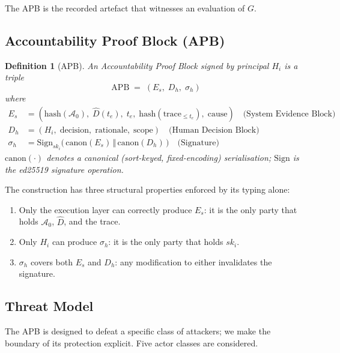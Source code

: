 \documentclass[11pt]{article}
\newtheorem{definition}{Definition}[section]
\newcommand{\Azero}{\mathcal{A}_0}
\newcommand{\Dhat}{\widehat{D}}
\newcommand{\Es}{E_s}
\newcommand{\Dh}{D_h}
\newcommand{\sigh}{\sigma_h}
\newcommand{\Hi}{H_i}
\newcommand{\ski}{sk_i}
\newcommand{\APB}{\mathrm{APB}}
\begin{document}
The APB is the recorded artefact that witnesses an evaluation of
$G$.

\subsection{Accountability Proof Block (APB)}
\label{sec:apb}

\begin{definition}[APB]
\label{def:apb}
An \emph{Accountability Proof Block} signed by principal $\Hi$ is a
triple
\[
  \APB \;=\; (\Es,\;\Dh,\;\sigh)
\]
where
\begin{align*}
  \Es &= (\mathrm{hash}(\Azero),\; \Dhat(t_e),\; t_e,\;
         \mathrm{hash}(\mathrm{trace}_{\le t_e}),\; \mathrm{cause})
         \quad\text{(System Evidence Block)}\\
  \Dh &= (\Hi,\;\mathrm{decision},\;\mathrm{rationale},\;\mathrm{scope})
         \quad\text{(Human Decision Block)}\\
  \sigh &= \mathrm{Sign}_{\ski}\!\bigl(\,
            \mathrm{canon}(\Es) \,\Vert\, \mathrm{canon}(\Dh)
            \,\bigr)
         \quad\text{(Signature)}
\end{align*}
$\mathrm{canon}(\cdot)$ denotes a canonical (sort-keyed, fixed-encoding)
serialisation; $\mathrm{Sign}$ is the ed25519 signature operation.
\end{definition}

The construction has three structural properties enforced by its
typing alone:

\begin{enumerate}[leftmargin=2em, topsep=2pt]
  \item Only the execution layer can correctly produce $\Es$: it is the
        only party that holds $\Azero$, $\Dhat$, and the trace.
  \item Only $\Hi$ can produce $\sigh$: it is the only party that holds
        $\ski$.
  \item $\sigh$ covers both $\Es$ and $\Dh$: any modification to either
        invalidates the signature.
\end{enumerate}

\subsection{Threat Model}
\label{sec:threat}

The APB is designed to defeat a specific class of attackers; we make
the boundary of its protection explicit. Five actor classes are
considered.
\end{document}

